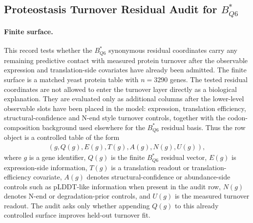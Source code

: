 
\subsection{Proteostasis Turnover Residual Audit for $B^{\ast}_{Q6}$}
\label{sec:bioreality-proteostasis-turnover-residual-audit}

\paragraph{Finite surface.}
This record tests whether the $B^{\ast}_{Q6}$ synonymous residual coordinates carry any remaining predictive contact with measured protein turnover after the observable expression and translation-side covariates have already been admitted. The finite surface is a matched yeast protein table with $n=3290$ genes. The tested residual coordinates are not allowed to enter the turnover layer directly as a biological explanation. They are evaluated only as additional columns after the lower-level observable slots have been placed in the model: expression, translation efficiency, structural-confidence and N-end style turnover controls, together with the codon-composition background used elsewhere for the $B^{\ast}_{Q6}$ residual basis. Thus the row object is a controlled table of the form
$$
\begin{aligned}
  (g, Q(g), E(g), T(g), A(g), N(g), U(g)),
\end{aligned}
$$
where $g$ is a gene identifier, $Q(g)$ is the finite $B^{\ast}_{Q6}$ residual vector, $E(g)$ is expression-side information, $T(g)$ is a translation readout or translation-efficiency covariate, $A(g)$ denotes structural-confidence or abundance-side controls such as pLDDT-like information when present in the audit row, $N(g)$ denotes N-end or degradation-prior controls, and $U(g)$ is the measured turnover readout. The audit asks only whether appending $Q(g)$ to this already controlled surface improves held-out turnover fit.

